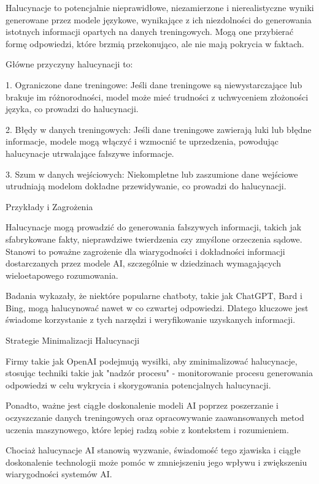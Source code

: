 Halucynacje to potencjalnie nieprawidłowe, niezamierzone i nierealistyczne wyniki generowane przez modele językowe, wynikające z ich niezdolności do generowania istotnych informacji opartych na danych treningowych. Mogą one przybierać formę odpowiedzi, które brzmią przekonująco, ale nie mają pokrycia w faktach.

Główne przyczyny halucynacji to:

1. Ograniczone dane treningowe: Jeśli dane treningowe są niewystarczające lub brakuje im różnorodności, model może mieć trudności z uchwyceniem złożoności języka, co prowadzi do halucynacji.

2. Błędy w danych treningowych: Jeśli dane treningowe zawierają luki lub błędne informacje, modele mogą włączyć i wzmocnić te uprzedzenia, powodując halucynacje utrwalające fałszywe informacje.

3. Szum w danych wejściowych: Niekompletne lub zaszumione dane wejściowe utrudniają modelom dokładne przewidywanie, co prowadzi do halucynacji.

Przykłady i Zagrożenia

Halucynacje mogą prowadzić do generowania fałszywych informacji, takich jak sfabrykowane fakty, nieprawdziwe twierdzenia czy zmyślone orzeczenia sądowe. Stanowi to poważne zagrożenie dla wiarygodności i dokładności informacji dostarczanych przez modele AI, szczególnie w dziedzinach wymagających wieloetapowego rozumowania.

Badania wykazały, że niektóre popularne chatboty, takie jak ChatGPT, Bard i Bing, mogą halucynować nawet w co czwartej odpowiedzi. Dlatego kluczowe jest świadome korzystanie z tych narzędzi i weryfikowanie uzyskanych informacji.

Strategie Minimalizacji Halucynacji

Firmy takie jak OpenAI podejmują wysiłki, aby zminimalizować halucynacje, stosując techniki takie jak "nadzór procesu" - monitorowanie procesu generowania odpowiedzi w celu wykrycia i skorygowania potencjalnych halucynacji.

Ponadto, ważne jest ciągłe doskonalenie modeli AI poprzez poszerzanie i oczyszczanie danych treningowych oraz opracowywanie zaawansowanych metod uczenia maszynowego, które lepiej radzą sobie z kontekstem i rozumieniem.

Chociaż halucynacje AI stanowią wyzwanie, świadomość tego zjawiska i ciągłe doskonalenie technologii może pomóc w zmniejszeniu jego wpływu i zwiększeniu wiarygodności systemów AI.

